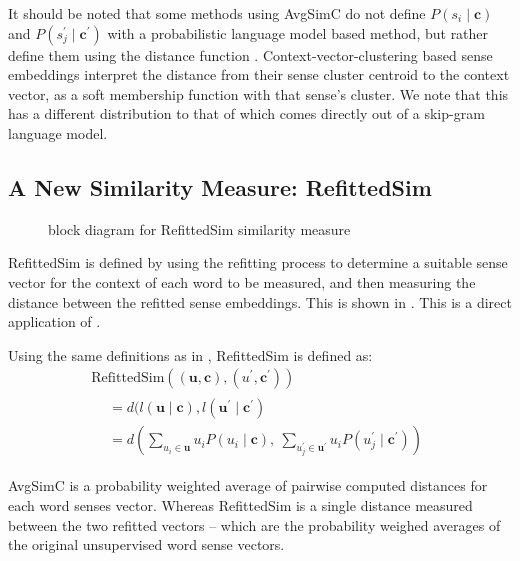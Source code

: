 \documentclass{sig-alternate}
\renewcommand{\c}{\mathbf{c}}
\renewcommand{\u}{\mathbf{u}}
\begin{document}
It should be noted that some methods using AvgSimC  do not define  $P(s_{i}\mid\c)$ and $P(s_{j}^{\prime}\mid\c^\prime)$ with a probabilistic language model based method, but rather define them using the distance function \parencite{Reisinger2010, Huang2012}. Context-vector-clustering based sense embeddings interpret the distance from their sense cluster centroid to the context vector, as a soft membership function with that sense's cluster. We note that this has a different distribution to that of which comes directly out of a skip-gram language model.



\subsection{A New Similarity Measure: RefittedSim}\label{RefittedSimVsAvgSimC}
\begin{figure}
	\begin{adjustbox}{max width=\columnwidth}
	
	\end{adjustbox}
	\caption{ block diagram for RefittedSim similarity measure} \label{diaRefittedSim}
\end{figure}

RefittedSim is defined by using the refitting process to determine a suitable sense vector for the context of each word to be measured, and then measuring the distance between the refitted sense embeddings. This is shown in .
This is a direct application of  . 

Using the same definitions as in , RefittedSim is defined as:
\begin{multline} \label{eq:refittedsim}
\mathrm{RefittedSim}((\u,\c),(u^{\prime},\c^{\prime}))\\
\begin{aligned}
&= d(l(\u \mid \c), l(\u^\prime \mid \c^\prime)\\
&= d\left(
\sum_{u_{i}\in\u}u_{i}P(u_{i}\mid\c),\:
\sum_{u_{j}^{\prime}\in\u^{\prime}}u_{i}P(u_{j}^{\prime}\mid\c^{\prime})\right)
\end{aligned}
\end{multline}

AvgSimC is a probability weighted average of pairwise computed distances for each word senses vector.
Whereas RefittedSim is a single distance measured between the two refitted vectors -- which are the probability weighed averages of the original unsupervised word sense vectors.
\end{document}
